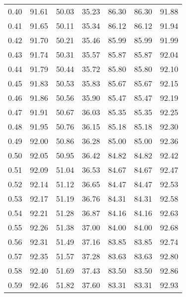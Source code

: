 \begin{tabular}{|c|c|c|c|c|c|c|}
      0.40 &     91.61 &     50.03 &      35.23 &   86.30 &      86.30 &         91.88 \\
      0.41 &     91.65 &     50.11 &      35.34 &   86.12 &      86.12 &         91.94 \\
      0.42 &     91.70 &     50.21 &      35.46 &   85.99 &      85.99 &         91.99 \\
      0.43 &     91.74 &     50.31 &      35.57 &   85.87 &      85.87 &         92.04 \\
      0.44 &     91.79 &     50.44 &      35.72 &   85.80 &      85.80 &         92.10 \\
      0.45 &     91.83 &     50.53 &      35.83 &   85.67 &      85.67 &         92.15 \\
      0.46 &     91.86 &     50.56 &      35.90 &   85.47 &      85.47 &         92.19 \\
      0.47 &     91.91 &     50.67 &      36.03 &   85.35 &      85.35 &         92.25 \\
      0.48 &     91.95 &     50.76 &      36.15 &   85.18 &      85.18 &         92.30 \\
      0.49 &     92.00 &     50.86 &      36.28 &   85.00 &      85.00 &         92.36 \\
      0.50 &     92.05 &     50.95 &      36.42 &   84.82 &      84.82 &         92.42 \\
      0.51 &     92.09 &     51.04 &      36.53 &   84.67 &      84.67 &         92.47 \\
      0.52 &     92.14 &     51.12 &      36.65 &   84.47 &      84.47 &         92.53 \\
      0.53 &     92.17 &     51.19 &      36.76 &   84.31 &      84.31 &         92.58 \\
      0.54 &     92.21 &     51.28 &      36.87 &   84.16 &      84.16 &         92.63 \\
      0.55 &     92.26 &     51.38 &      37.00 &   84.00 &      84.00 &         92.68 \\
      0.56 &     92.31 &     51.49 &      37.16 &   83.85 &      83.85 &         92.74 \\
      0.57 &     92.35 &     51.57 &      37.28 &   83.63 &      83.63 &         92.80 \\
      0.58 &     92.40 &     51.69 &      37.43 &   83.50 &      83.50 &         92.86 \\
      0.59 &     92.46 &     51.82 &      37.60 &   83.31 &      83.31 &         92.93 \\

\end{tabular}
